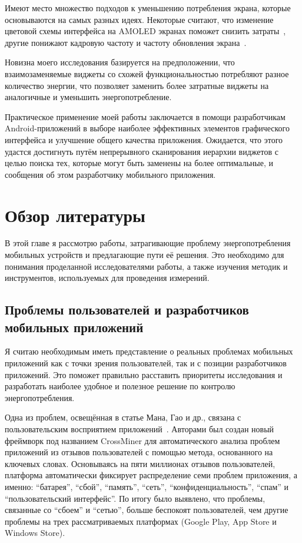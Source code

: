 \documentclass[a4paper,14pt]{extarticle} %
\begin{document}
	Имеют место множество подходов к уменьшению потребления экрана, которые основываются на самых разных идеях. Некоторые считают, что изменение цветовой схемы интерфейса на AMOLED экранах поможет снизить затраты~\parencite{wan2015detecting}, другие понижают кадровую частоту и частоту обновления экрана~\parencite{lee2018improving, huang2014intelligent}. 
	
	Новизна моего исследования базируется на предположении, что взаимозаменяемые виджеты со схожей функциональностью потребляют разное количество энергии, что позволяет заменить более затратные виджеты на аналогичные и уменьшить энергопотребление.
	
	Практическое применение моей работы заключается в помощи разработчикам Android-приложений в выборе наиболее эффективных элементов графического интерфейса и улучшение общего качества приложения. Ожидается, что этого удастся достигнуть путём непрерывного сканирования иерархии виджетов с целью поиска тех, которые могут быть заменены на более оптимальные, и сообщения об этом разработчику мобильного приложения.
	
	\newpage
	\section{Обзор литературы}
	
	В этой главе я рассмотрю работы, затрагивающие проблему энергопотребления мобильных устройств и предлагающие пути её решения. Это необходимо для понимания проделанной  исследователями работы, а также изучения методик и инструментов, используемых для проведения измерений.
	
	\subsection{Проблемы пользователей и разработчиков мобильных приложений}
	
	Я считаю необходимым иметь представление о реальных проблемах мобильных приложений как с точки зрения пользователей, так и с позиции разработчиков приложений. Это поможет правильно расставить приоритеты исследования и разработать наиболее удобное и полезное решение по контролю энергопотребления.
	
	Одна из проблем, освещённая в статье Мана, Гао и др., связана с пользовательским восприятием приложений~\parencite{man2016experience}. Авторами был создан новый фреймворк под названием CrossMiner для автоматического анализа проблем приложений из отзывов пользователей с помощью метода, основанного на ключевых словах. Основываясь на пяти миллионах отзывов пользователей, платформа автоматически фиксирует распределение семи проблем приложения, а именно: “батарея”, “сбой”, “память”, “сеть”, “конфиденциальность”, “спам” и “пользовательский интерфейс”. По итогу было выявлено, что проблемы, связанные со “сбоем” и “сетью”, больше беспокоят пользователей, чем другие проблемы на трех рассматриваемых платформах (Google Play, App Store и Windows Store).
	
\end{document}
